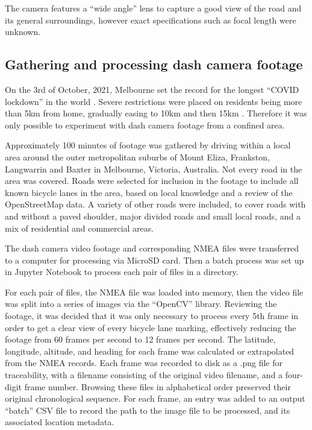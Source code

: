 \documentclass[11pt,twoside]{report}
\begin{document}
The camera features a ``wide angle'' lens to capture a good view of the road and its general surroundings, however exact specifications such as focal length were unknown.


\subsection{Gathering and processing dash camera footage}
\label{s:rq3b}

On the 3rd of October, 2021, Melbourne set the record for the longest ``COVID lockdown'' in the world \cite{lockdown_record}.  Severe restrictions were placed on residents being more than 5km from home, gradually easing to 10km and then 15km \cite{lockdown_5km}.  Therefore it was only possible to experiment with dash camera footage from a confined area.

Approximately 100 minutes of footage was gathered by driving within a local area around the outer metropolitan suburbs of Mount Eliza, Frankston, Langwarrin and Baxter in Melbourne, Victoria, Australia.  Not every road in the area was covered.  Roads were selected for inclusion in the footage to include all known bicycle lanes in the area, based on local knowledge and a review of the OpenStreetMap data.  A variety of other roads were included, to cover roads with and without a paved shoulder, major divided roads and small local roads, and a mix of residential and commercial areas.

The dash camera video footage and corresponding NMEA files were transferred to a computer for processing via MicroSD card.  Then a batch process was set up in Jupyter Notebook to process each pair of files in a directory.

For each pair of files, the NMEA file was loaded into memory, then the video file was split into a series of images via the ``OpenCV'' library.  Reviewing the footage, it was decided that it was only necessary to process every 5th frame in order to get a clear view of every bicycle lane marking, effectively reducing the footage from 60 frames per second to 12 frames per second.  The latitude, longitude, altitude, and heading for each frame was calculated or extrapolated from the NMEA records.  Each frame was recorded to disk as a .png file for traceability, with a filename consisting of the original video filename, and a four-digit frame number.  Browsing these files in alphabetical order preserved their original chronological sequence.  For each frame, an entry was added to an output ``batch'' CSV file to record the path to the image file to be processed, and its associated location metadata.
\end{document}
